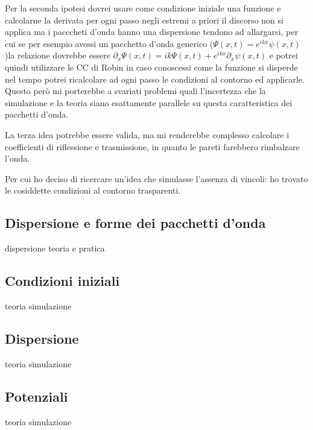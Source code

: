 Per la seconda ipotesi dovrei usare come condizione iniziale una funzione e calcolarne la derivata per ogni passo negli estremi a priori il discorso non si applica ma i pacccheti d'onda hanno una dispersione tendono ad allargarsi, per cui se  per esempio avessi un pacchetto d'onda generico ($\Psi(x,t) = e^{ikx} \psi(x,t)$)la relazione dovrebbe essere $\partial_x \Psi(x,t) = ik \Psi(x,t) + e^{ikx}\partial_x\psi(x,t)$ e potrei quindi utilizzare le CC di Robin in caso conoscessi come la funzione si disperde nel tempo potrei ricalcolare ad ogni passo le condizioni al contorno ed applicarle. Questo per\`o mi porterebbe a svariati problemi quali l'incertezza che la simulazione e la teoria siano esattamente parallele su questa caratteristica dei pacchetti d'onda.

La terza idea potrebbe essere valida, ma mi renderebbe complesso calcolare i coefficienti di riflessione e trasmissione, in quanto le pareti farebbero rimbalzare l'onda.

Per cui ho deciso di ricercare un'idea che simulasse l'assenza di vincoli: ho trovato le cosiddette condizioni al contorno trasparenti.
\subsection{Dispersione e forme dei pacchetti d'onda}
dispersione teoria e pratica
\subsection{Condizioni iniziali}
teoria
simulazione
\subsection{Dispersione}
teoria
simulazione
\subsection{Potenziali}
teoria
simulazione